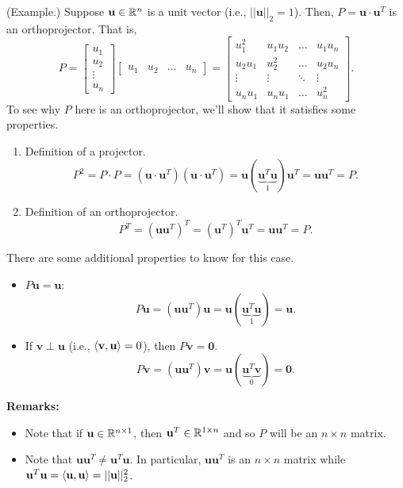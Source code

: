 \documentclass[letterpaper]{article}
\newcommand{\0}{\mathbf{0}}
\newcommand{\vv}{\mathbf{v}}
\renewcommand{\u}{\mathbf{u}}
\begin{document}
\begin{mdframed}
    (Example.) Suppose $\u \in \R^n$ is a unit vector (i.e., $||\u||_2 = 1$). Then, $P = \u \cdot \u^T$ is an orthoprojector. That is, 
    \[P = \begin{bmatrix}
        u_1 \\ u_2 \\ \vdots \\ u_n
    \end{bmatrix} \begin{bmatrix}
        u_1 & u_2 & \hdots & u_n
    \end{bmatrix} = \begin{bmatrix}
        u_1^2 & u_1 u_2 & \hdots & u_1 u_n \\ 
        u_2 u_1 & u_2^2 & \hdots & u_2 u_n \\ 
        \vdots & \vdots & \ddots & \vdots \\ 
        u_n u_1 & u_n u_1 & \hdots & u_n^2 
    \end{bmatrix}.\]
    To see why $P$ here is an orthoprojector, we'll show that it satisfies some properties. 
    \begin{enumerate}
        \item Definition of a projector.
        \[P^2 = P \cdot P = (\u \cdot \u^T) (\u \cdot \u^T) = \u (\underbrace{\u^T \u}_{1}) \u^T = \u \u^T = P.\]

        \item Definition of an orthoprojector.
        \[P^T = (\u \u^T)^T = (\u^T)^T \u^T = \u\u^T = P.\]
    \end{enumerate}
    There are some additional properties to know for this case. 
    \begin{itemize}
        \item $P\u = \u$:
        \[P\u = (\u\u^T)\u = \u(\underbrace{\u^T \u}_{1}) = \u.\]

        \item If $\vv \perp \u$ (i.e., $\cyclic{\vv, \u} = 0$), then $P\vv = \0$. 
        \[P\vv = (\u\u^T)\vv = \u(\underbrace{\u^T\vv}_{0}) = \0.\]
    \end{itemize}
\end{mdframed}
\textbf{Remarks:} 
\begin{itemize}
    \item Note that if $\u \in \R^{n \times 1}$, then $\u^T \in \R^{1 \times n}$ and so $P$ will be an $n \times n$ matrix.
    \item Note that $\u \u^T \neq \u^T \u$. In particular, $\u \u^T$ is an $n \times n$ matrix while $\u^T \u = \cyclic{\u, \u} = ||\u||_{2}^{2}$. 
\end{itemize}
\end{document}
